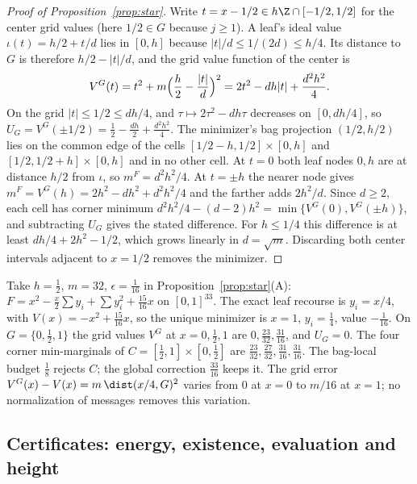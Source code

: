 \begin{proof}[Proof of Proposition~\ref{prop:star}]
Write $t=x-1/2\in h\Z\cap[-1/2,1/2]$ for the center grid values (here
$1/2\in G$ because $j\ge1$). A leaf's ideal value $\iota(t)=h/2+t/d$ lies in
$[0,h]$ because $|t|/d\le1/(2d)\le h/4$. Its distance to $G$ is therefore
$h/2-|t|/d$, and the grid value function of the center is
\[
V^G(t)=t^2+m\Bigl(\frac h2-\frac{|t|}d\Bigr)^2=2t^2-dh|t|+\frac{d^2h^2}4 .
\]
On the grid $|t|\le1/2\le dh/4$, and $\tau\mapsto2\tau^2-dh\tau$ decreases on
$[0,dh/4]$, so $U_G=V^G(\pm1/2)=\frac12-\frac{dh}2+\frac{d^2h^2}4$. The
minimizer's bag projection $(1/2,h/2)$ lies on the common edge of the cells
$[1/2-h,1/2]\times[0,h]$ and $[1/2,1/2+h]\times[0,h]$ and in no other cell.
At $t=0$ both leaf nodes $0,h$ are at distance $h/2$ from $\iota$, so
$m^F=d^2h^2/4$. At $t=\pm h$ the nearer node gives
$m^F=V^G(h)=2h^2-dh^2+d^2h^2/4$ and the farther adds $2h^2/d$. Since $d\ge2$,
each cell has corner minimum $d^2h^2/4-(d-2)h^2=\min\{V^G(0),V^G(\pm h)\}$,
and subtracting $U_G$ gives the stated difference. For $h\le1/4$ this
difference is at least $dh/4+2h^2-1/2$, which grows linearly in $d=\sqrt m$.
Discarding both center intervals adjacent to $x=1/2$ removes the minimizer.
\end{proof}

\begin{example}[An instance with $h=\frac12$]\label{ex:cr-star32}
Take $h=\frac12$, $m=32$, $\epsilon=\frac1{16}$ in
Proposition~\ref{prop:star}(A):
$F=x^2-\frac x2\sum y_i+\sum y_i^2+\frac{15}{16}x$ on $[0,1]^{33}$.
The exact leaf recourse is $y_i=x/4$, with $V(x)=-x^2+\frac{15}{16}x$, so
the unique minimizer is $x=1$, $y_i=\frac14$, value $-\frac1{16}$. On
$G=\{0,\frac12,1\}$ the grid values $V^G$ at $x=0,\frac12,1$ are
$0,\frac{23}{32},\frac{31}{16}$, and $U_G=0$. The four corner
min-marginals of $C=[\frac12,1]\times[0,\frac12]$ are
$\frac{23}{32},\frac{27}{32},\frac{31}{16},\frac{31}{16}$. The bag-local
budget $\frac18$ rejects $C$; the global correction $\frac{33}{16}$ keeps it.
The grid error $V^G(x)-V(x)=m\,\dist(x/4,G)^2$ varies from $0$ at $x=0$ to
$m/16$ at $x=1$; no normalization of messages removes this variation.
\end{example}

\subsection{Certificates: energy, existence, evaluation and height}

